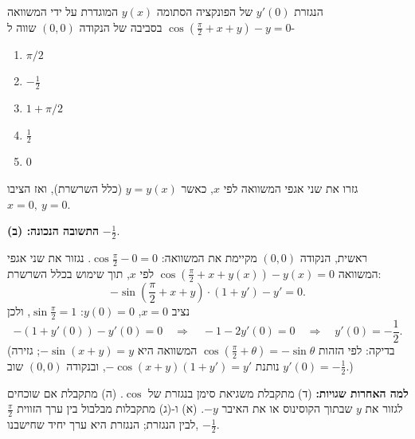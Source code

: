 
\begin{question}
הנגזרת $y'(0)$ של הפונקציה הסתומה $y(x)$ המוגדרת על ידי המשוואה
$\cos\left(\frac{\pi}{2}+x+y\right)-y=0$ בסביבה של הנקודה $(0,0)$ שווה ל-
\begin{enumerate}
  \item $\pi/2$
  \item $-\frac12$
  \item $1+\pi/2$
  \item $\frac12$
  \item $0$
\end{enumerate}
\end{question}

\begin{hint}
גזרו את שני אגפי המשוואה לפי $x$, כאשר $y=y(x)$ (כלל השרשרת), ואז הציבו $x=0,\ y=0$.
\end{hint}

\begin{solution}
\textbf{התשובה הנכונה: (ב)} $-\frac12$.

ראשית, הנקודה $(0,0)$ מקיימת את המשוואה: $\cos\frac{\pi}{2}-0=0$.
נגזור את שני אגפי המשוואה $\cos\left(\frac{\pi}{2}+x+y(x)\right)-y(x)=0$ לפי $x$, תוך שימוש בכלל השרשרת:
\[
-\sin\left(\frac{\pi}{2}+x+y\right)\cdot\left(1+y'\right)-y'=0 .
\]
נציב $x=0$, $y(0)=0$: $\sin\frac{\pi}{2}=1$, ולכן
\[
-(1+y'(0))-y'(0)=0\quad\Longrightarrow\quad -1-2y'(0)=0\quad\Longrightarrow\quad y'(0)=\boxed{-\frac12}.
\]
(בדיקה: לפי הזהות $\cos(\frac{\pi}{2}+\theta)=-\sin\theta$ המשוואה היא $-\sin(x+y)=y$; גזירה נותנת $-\cos(x+y)(1+y')=y'$, ובנקודה $(0,0)$ שוב $y'(0)=-\frac12$.)

\textbf{למה האחרות שגויות:} (ד) מתקבלת משגיאת סימן בנגזרת של $\cos$. (ה) מתקבלת אם שוכחים לגזור את $y$ שבתוך הקוסינוס או את האיבר $-y$. (א) ו-(ג) מתקבלות מבלבול בין ערך הזווית $\frac{\pi}{2}$ לבין הנגזרת; הנגזרת היא ערך יחיד שחישבנו, $-\frac12$.
\end{solution}
